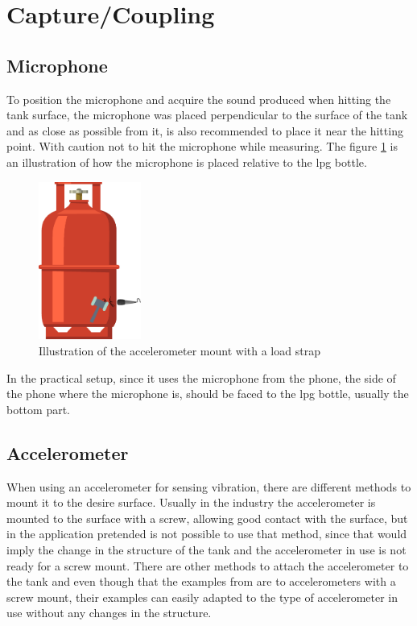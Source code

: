 \section{Capture/Coupling}
\subsection{Microphone}
To position the microphone and acquire the sound produced when hitting the tank surface, the microphone was placed perpendicular to the surface of the tank and as close as possible from it, is also recommended to place it near the hitting point. With caution not to hit the microphone while measuring. The figure \ref{fig:micmount} is an illustration of how the microphone is placed relative to the \acrshort{lpg} bottle.
\begin{figure}[]
    \centering
    \includegraphics[width=0.3\textwidth]{Chapters/4CHP/Figures/micWimpactHamm.eps}
    \caption{Illustration of the accelerometer mount with a load strap}
    \label{fig:micmount}
\end{figure}
In the practical setup, since it uses the microphone from the phone, the side of the phone where the microphone is, should be faced to the \acrshort{lpg} bottle, usually the bottom part.
\subsection{Accelerometer}
When using an accelerometer for sensing vibration, there are different methods to mount it to the desire surface. Usually in the industry the accelerometer is mounted to the surface with a screw, allowing good contact with the surface, but in the application pretended is not possible to use that method, since that would imply the change in the structure of the tank and the accelerometer in use is not ready for a screw mount. There are other methods to attach the accelerometer to the tank and even though that the examples from \cite{GuidelinesMountingTest} are to accelerometers with a screw mount, their examples can easily adapted to the type of accelerometer in use without any changes in the structure.

